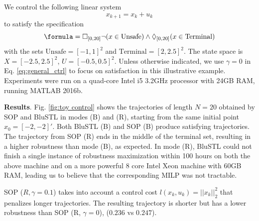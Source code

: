 \begin{exmp}
\label{ex:toyproblem}
We control the following linear system
\begin{equation}
\label{eq:PointMass}
x_{k+1} = x_k + u_k
\end{equation}
to satisfy the specification
\[\formula = \always_{[0,20]} \neg (x \in \text{Unsafe}) \land \eventually_{[0,20]} (x \in \text{Terminal})\]
with the sets $\text{Unsafe}=[-1,1]^2$ and $\text{Terminal}=[2,2.5]^2$. 
The state space is $X=[-2.5,2.5]^2$, $U=[-0.5,0.5]^2$.
Unless otherwise indicated, we use $\gamma=0$ in Eq. \ref{eq:general_ctrl} to focus on satisfaction in this illustrative example. 
Experiments were run on a quad-core Intel i5 3.2GHz processor with 24GB RAM, running MATLAB 2016b.

\textbf{Results}.
Fig. \ref{fig:toy control} shows the trajectories of length $N=20$ obtained by SOP and BluSTL in modes (B) and (R), starting from the same initial point $x_0=[-2,-2]'$.
Both BluSTL (B) and SOP (B) produce satisfying trajectories. 
The trajectory from SOP (R) ends in the middle of the terminal set, resulting in a higher robustness than mode (B), as expected. 
In mode (R), BluSTL could not finish a single instance of robustness maximization within 100 hours on both the above machine and on a more powerful 8 core Intel Xeon machine with 60GB RAM, leading us to believe that the corresponding MILP was not tractable.
 
SOP ($R, \gamma=0.1$) takes into account a control cost $l(x_k,u_k) = ||x_k||_{2}^2$ that penalizes longer trajectories.
The resulting trajectory is shorter but has a lower robustness than SOP (R, $\gamma = 0$), ($0.236$ vs $0.247$).


\end{exmp}
